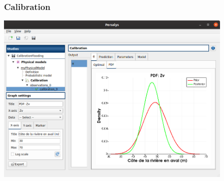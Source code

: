 \documentclass{beamer}
\begin{document}
\begin{frame}
  \frametitle{Calibration}
    
  \begin{center}
  \includegraphics[width=0.86\textwidth]{figures/calibration-Zv-prior-posterior.png}
  \end{center}
  
  \end{frame}

\end{document}
